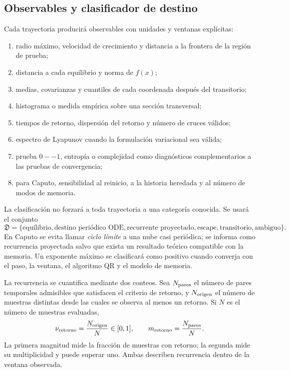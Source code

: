 \subsection{Observables y clasificador de destino}
\label{camp:observables}

Cada trayectoria producirá observables con unidades y ventanas explícitas:

\begin{enumerate}
  \item radio máximo, velocidad de crecimiento y distancia a la frontera de la
        región de prueba;
  \item distancia a cada equilibrio y norma de \(f(x)\);
  \item medias, covarianzas y cuantiles de cada coordenada después del
        transitorio;
  \item histograma o medida empírica sobre una sección transversal;
  \item tiempos de retorno, dispersión del retorno y número de cruces válidos;
  \item espectro de Lyapunov cuando la formulación variacional sea válida;
  \item prueba \(0--1\), entropía o complejidad como diagnósticos
        complementarios a las pruebas de convergencia;
  \item para Caputo, sensibilidad al reinicio, a la historia heredada y al
        número de modos de memoria.
\end{enumerate}

La clasificación no forzará a toda trayectoria a una categoría conocida. Se
usará el conjunto
\begin{equation}
 \mathfrak D=\{\text{equilibrio},\text{destino periódico ODE},
 \text{recurrente proyectado},\text{escape},\text{transitorio},
 \text{ambiguo}\}.
 \label{camp:eq-destination-set}
\end{equation}
En Caputo se evita llamar \emph{ciclo límite} a una nube casi periódica; se
informa como recurrencia proyectada salvo que exista un resultado teórico
compatible con la memoria. Un exponente máximo se clasificará como positivo
cuando converja con el paso, la ventana, el algoritmo QR y el modelo de memoria.

La recurrencia se cuantifica mediante dos conteos. Sea \(N_{\rm pares}\) el
número de pares temporales admisibles que satisfacen el criterio de retorno,
y \(N_{\rm origen}\) el número de muestras distintas desde las cuales se
observa al menos un retorno. Si \(N\) es el número de muestras evaluadas,
\[
 \nu_{\rm retorno}=\frac{N_{\rm origen}}{N}\in[0,1],
 \qquad
 m_{\rm retorno}=\frac{N_{\rm pares}}{N}.
\]
La primera magnitud mide la fracción de muestras con retorno; la segunda mide
su multiplicidad y puede superar uno. Ambas describen recurrencia dentro de
la ventana observada.

